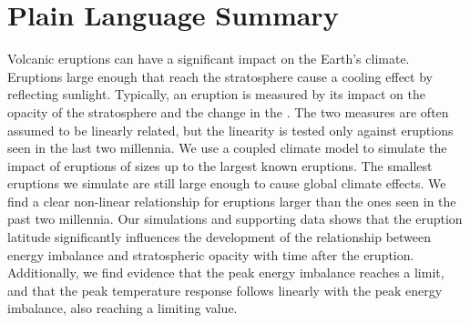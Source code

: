 \documentclass[draft]{agujournal2019}
\begin{document}
  \section*{Plain Language Summary}


  Volcanic eruptions can have a significant impact on the Earth's climate. Eruptions
  large enough that  reach the stratosphere cause a cooling effect by reflecting
  sunlight. Typically, an eruption is measured by its impact on the opacity of the
  stratosphere and the change in the . The two measures are often assumed to be
  linearly related, but the linearity is tested only against eruptions seen in the last
  two millennia. We use a coupled climate model to simulate the impact of eruptions of
  sizes up to the largest known eruptions. The smallest eruptions we simulate are still
  large enough to cause global climate effects. We find a clear non-linear relationship
  for eruptions larger than the ones seen in the past two millennia. Our simulations and
  supporting data shows that the eruption latitude significantly influences the
  development of the relationship between energy imbalance and stratospheric opacity
  with time after the eruption. Additionally, we find evidence that the peak energy
  imbalance reaches a limit, and that the peak temperature response follows linearly
  with the peak energy imbalance, also reaching a limiting value.

\end{document}
